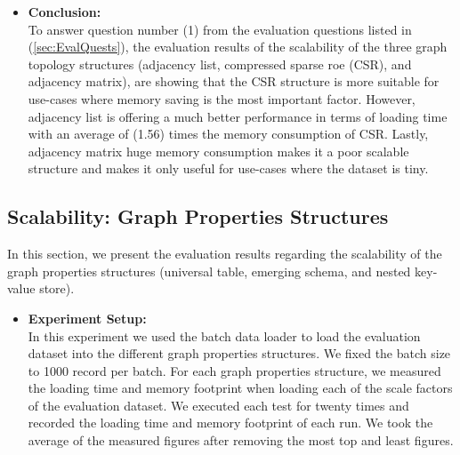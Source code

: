 {\begin{itemize}
The adjacency matrix memory consumption is much higher in comparison to CSR and adjacency list due to the memory requirements of adjacency matrix which is \mbox{($n^2$ bits)}, where "$n$" is the number of vertices in the graph. Also, the loading time of adjacency matrix is relatively high due to the need to expand each of the (\texttt{std::vector}) data structures of adjacency matrix every time a new element needs to be included into the matrix.

\item \textbf{Conclusion:}\\
To answer question number (1) from the evaluation questions listed in (\ref{sec:EvalQuests}), the evaluation results of the scalability of the three graph topology structures (adjacency list, compressed sparse roe (CSR), and adjacency matrix), are showing that the CSR structure is more suitable for use-cases where memory saving is the most important factor. However, adjacency list is offering a much better performance in terms of loading time with an average of (1.56) times the memory consumption of CSR. Lastly, adjacency matrix huge memory consumption makes it a poor scalable structure and makes it only useful for use-cases where the dataset is tiny.

\end{itemize}


\subsection{Scalability: Graph Properties Structures}
\label{subsec:scalability-properties}

In this section, we present the evaluation results regarding the scalability of the graph properties structures (universal table, emerging schema, and nested key-value store).

\begin{itemize}  

\item \textbf{Experiment Setup:}\\
In this experiment we used the batch data loader to load the evaluation dataset into the different graph properties structures. We fixed the batch size to 1000 record per batch. For each graph properties structure, we measured the loading time and memory footprint when loading each of the scale factors of the evaluation dataset. We executed each test for twenty times and recorded the loading time and memory footprint of each run. We took the average of the measured figures after removing the most top and least figures.



\end{itemize}}
